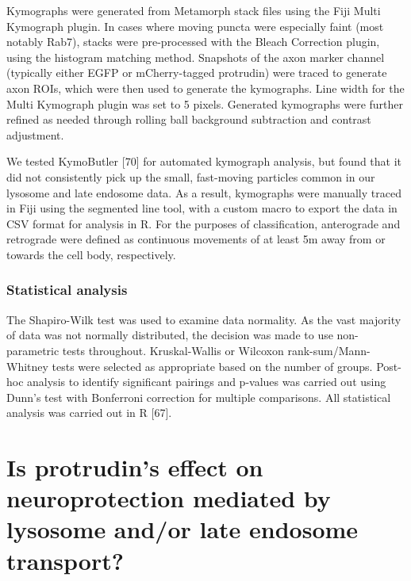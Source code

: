 \documentclass[
  12pt,
  a4paper,
]{book}
\renewcommand{\chaptermark}[1]{\markboth{#1}{}}
\begin{document}
Kymographs were generated from Metamorph stack files using the Fiji Multi Kymograph plugin. In cases where moving puncta were especially faint (most notably Rab7), stacks were pre-processed with the Bleach Correction plugin, using the histogram matching method. Snapshots of the axon marker channel (typically either EGFP or mCherry-tagged protrudin) were traced to generate axon ROIs, which were then used to generate the kymographs. Line width for the Multi Kymograph plugin was set to 5 pixels. Generated kymographs were further refined as needed through rolling ball background subtraction and contrast adjustment.

We tested KymoButler {[}70{]} for automated kymograph analysis, but found that it did not consistently pick up the small, fast-moving particles common in our lysosome and late endosome data. As a result, kymographs were manually traced in Fiji using the segmented line tool, with a custom macro to export the data in CSV format for analysis in R. For the purposes of classification, anterograde and retrograde were defined as continuous movements of at
least 5\textmu{}m away from or towards the cell body, respectively.

\hypertarget{statistical-analysis}{%
\subsection{Statistical analysis}\label{statistical-analysis}}

The Shapiro-Wilk test was used to examine data normality. As the vast majority of data was not normally distributed, the decision was made to use non-parametric tests throughout. Kruskal-Wallis or Wilcoxon rank-sum/Mann-Whitney tests were selected as appropriate based on the number of groups. Post-hoc analysis to identify significant pairings and p-values was carried out using Dunn's test with Bonferroni correction for multiple comparisons. All statistical analysis was carried out in R {[}67{]}.

\hypertarget{is-protrudins-effect-on-neuroprotection-mediated-by-lysosome-andor-late-endosome-transport}{%
\chapter{Is protrudin's effect on neuroprotection mediated by lysosome and/or late endosome transport?}\label{is-protrudins-effect-on-neuroprotection-mediated-by-lysosome-andor-late-endosome-transport}}

\chaptermark{Lysosome and late endosome transport}
\end{document}
